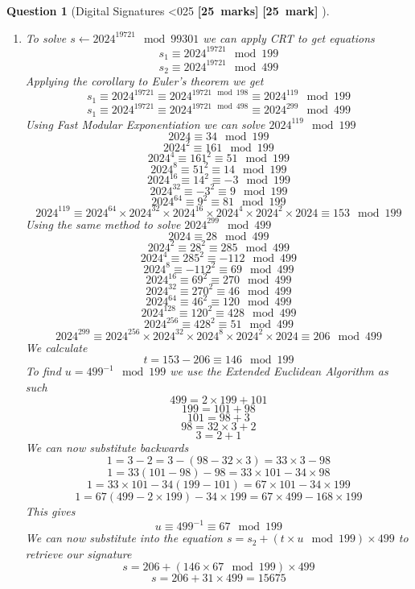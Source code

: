 \documentclass[a4paper]{article}
\theoremstyle{que}
\newtheorem{question}{Question}
\newcommand\points[1]{%
\ifnum1<0#1\relax%
    {\bf \small [#1~marks]}%
  \else%
    {\bf \small [#1~mark]}%
  \fi%
}%
\begin{document}
\begin{question}[Digital Signatures \points{25}]
\begin{enumerate}[label=(\alph*)]
    \item To solve \(s \leftarrow 2024^{19721} \mod 99301\) we can apply CRT to get equations
    \[s_1 \equiv 2024^{19721} \mod 199\]
    \[s_2 \equiv 2024^{19721} \mod 499\]
    Applying the corollary to Euler's theorem we get 
    \[s_1 \equiv 2024^{19721} \equiv 2024^{19721 \mod 198} \equiv 2024^ {119}\mod 199\]
    \[s_1 \equiv 2024^{19721} \equiv 2024^{19721 \mod 498} \equiv 2024^ {299}\mod 499\]
    Using Fast Modular Exponentiation we can solve \(2024^ {119}\mod 199\)
    \[2024 \equiv 34 \mod 199\]
    \[2024^{2} \equiv 161 \mod 199\]
    \[2024^{4} \equiv 161^{2} \equiv 51 \mod 199\]
    \[2024^{8} \equiv 51^{2} \equiv 14 \mod 199\]
    \[2024^{16} \equiv 14^{2} \equiv -3 \mod 199\]
    \[2024^{32} \equiv -3^{2} \equiv 9 \mod 199\]
    \[2024^{64} \equiv 9^{2} \equiv 81 \mod 199\]
    \[2024^{119} \equiv 2024^{64} \times 2024^{32} \times 2024^{16} \times 2024^{4} \times 2024^{2} \times 2024 \equiv 153 \mod 199\]
    Using the same method to solve \(2024^ {299}\mod 499\)
    \[2024 \equiv 28 \mod 499\]
    \[2024^{2} \equiv 28^2 \equiv 285 \mod 499\]
    \[2024^{4} \equiv 285^{2} \equiv -112 \mod 499\]
    \[2024^{8} \equiv -112^{2} \equiv 69 \mod 499\]
    \[2024^{16} \equiv 69^{2} \equiv 270 \mod 499\]
    \[2024^{32} \equiv 270^{2} \equiv 46 \mod 499\]
    \[2024^{64} \equiv 46^{2} \equiv 120 \mod 499\]
    \[2024^{128} \equiv 120^{2} \equiv 428 \mod 499\]
    \[2024^{256} \equiv 428^{2} \equiv 51 \mod 499\]
    \[2024^{299} \equiv 2024^{256} \times 2024^{32} \times 2024^{8} \times 2024^{2} \times 2024 \equiv 206 \mod 499\]
    We calculate \[t = 153 -206 \equiv 146 \mod 199\]
    To find \(u = 499^{-1} \mod 199\) we use the Extended Euclidean Algorithm as such
    \[499 = 2 \times 199 + 101\]
    \[199 = 101 + 98\]
    \[101 = 98 + 3\]
    \[98 = 32 \times 3 + 2\]
    \[3 = 2 + 1\]
    We can now substitute backwards 
    \[1 = 3 - 2 = 3 - (98 - 32 \times 3) = 33 \times 3 - 98\]
    \[1 = 33(101 - 98) - 98 = 33 \times 101 -  34 \times 98\]
    \[1 = 33 \times 101 -34 (199-101) = 67 \times 101 - 34 \times 199\]
    \[1 = 67(499- 2 \times 199) -  34 \times 199 = 67 \times 499 - 168 \times 199\]
    This gives \[u \equiv 499^{-1}  \equiv 67 \mod 199\]
    We can now substitute into the equation \(s = s_2 + (t \times u \mod 199 )\times 499\) to retrieve our signature 
    \[s = 206 + (146 \times 67 \mod 199 )\times 499\]
    \[s = 206 + 31 \times 499 = 15675\]
    

\end{enumerate}
\end{question}
\end{document}

